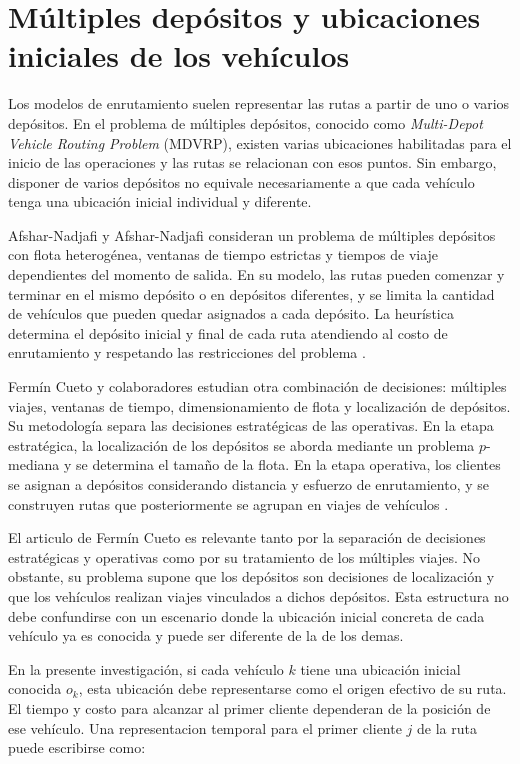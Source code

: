 \section{Múltiples depósitos y ubicaciones iniciales de los vehículos}
\label{sec:ubicaciones_iniciales}

Los modelos de enrutamiento suelen representar las rutas a partir de uno o varios depósitos. En el problema de múltiples depósitos, conocido como \textit{Multi-Depot Vehicle Routing Problem} (MDVRP), existen varias ubicaciones habilitadas para el inicio de las operaciones y las rutas se relacionan con esos puntos. Sin embargo, disponer de varios depósitos no equivale necesariamente a que cada vehículo tenga una ubicación inicial individual y diferente.

Afshar-Nadjafi y Afshar-Nadjafi consideran un problema de múltiples depósitos con flota heterogénea, ventanas de tiempo estrictas y tiempos de viaje dependientes del momento de salida. En su modelo, las rutas pueden comenzar y terminar en el mismo depósito o en depósitos diferentes, y se limita la cantidad de vehículos que pueden quedar asignados a cada depósito. La heurística determina el depósito inicial y final de cada ruta atendiendo al costo de enrutamiento y respetando las restricciones del problema \cite{afshar2017}.

Fermín Cueto y colaboradores estudian otra combinación de decisiones: múltiples viajes, ventanas de tiempo, dimensionamiento de flota y localización de depósitos. Su metodología separa las decisiones estratégicas de las operativas. En la etapa estratégica, la localización de los depósitos se aborda mediante un problema $p$-mediana y se determina el tamaño de la flota. En la etapa operativa, los clientes se asignan a depósitos considerando distancia y esfuerzo de enrutamiento, y se construyen rutas que posteriormente se agrupan en viajes de vehículos \cite{fermincueto2021}.

El articulo de Fermín Cueto es relevante tanto por la separación de decisiones estratégicas y operativas como por su tratamiento de los múltiples viajes. No obstante, su problema supone que los depósitos son decisiones de localización y que los vehículos realizan viajes vinculados a dichos depósitos. Esta estructura no debe confundirse con un escenario donde la ubicación inicial concreta de cada vehículo ya es conocida y puede ser diferente de la de los demas.

En la presente investigación, si cada vehículo $k$ tiene una ubicación inicial conocida $o_k$, esta ubicación debe representarse como el origen efectivo de su ruta. El tiempo y costo para alcanzar al primer cliente dependeran de la posición de ese vehículo. Una representacion temporal para el primer cliente $j$ de la ruta puede escribirse como:

